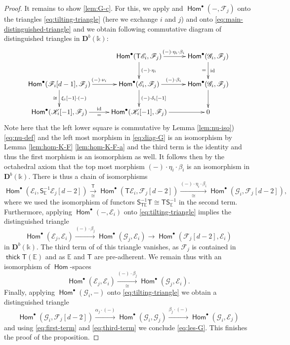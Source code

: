 \documentclass[a4paper,11pt, reqno]{amsart}
\def\E{\mathbb E}
\def\DD{\mathbf D}
\def\sE{\mathscr{E}}
\def\sF{\mathscr{F}}
\def\sG{\mathscr{G}}
\def\sK{\mathscr{K}}
\def\id{{\operatorname{id}}}
\newcommand{\opname}[1]{\operatorname{\mathsf{#1}}}
\newcommand{\Hom}{\opname{Hom}}
\newcommand{\thick}{\opname{thick}\nolimits}
\def\Db{\DD^b}
\newcommand{\bS}{\mathsf{S}}
\newcommand{\bT}{\mathsf{T}}
\theoremstyle{plain}
\theoremstyle{definition}
\numberwithin{equation}{section}
\newlength{\arrow}
\begin{document}
\begin{proof}
It remains to show \eqref{lem:G-c}. 
For this, 
we apply and $\Hom^\bullet ( - , \sF_j  )$ onto the triangles \eqref{eq:tilting-triangle} (here we exchange $i$ and $j$) and 
onto \eqref{eq:main-distinguished-triangle}
and we obtain following commutative diagram of distinguished triangles
in $\Db(\mathbb{k})$:
\begin{equation}\label{eq:diag-G}
\xymatrix{
     &  \Hom^\bullet ( \bT \sE_i  , \sF_j  ) \ar@{->}[d]^{(-)\cdot \eta_i } \ar@{->}[r]^{(-) \cdot \eta_i \cdot \beta_i } & \Hom^\bullet ( \sG_i , \sF_j  ) \ar@{->}[d]^{\id}_{=} \\
    \Hom^\bullet (  \sF_i [d-1]  , \sF_j ) \ar@{->}[d]^{\xi_i [-1] \cdot (-)}_{\cong} \ar@{->}[r]^{(-)\cdot \nu_i} &  \Hom^\bullet ( \sE_i  , \sF_j  ) \ar@{->}[d]^{(-)\cdot \delta_i [-1]} \ar@{->}[r]^{(-)\cdot \beta_i } & \Hom^\bullet ( \sG_i , \sF_j  ) \ar@{->}[d]^{} \\
 \Hom^\bullet ( \sK_i [-1] , \sF_j  ) \ar@{->}[r]^{\id}_{=} &  \Hom^\bullet (   \sK_i [-1] , \sF_j  ) \ar@{->}[r]^{} & 0 }
\end{equation}
Note here that the left lower square 
is commutative by  Lemma \ref{lem:nu-iso}) \eqref{eq:nu-def}
and the left most morphism in \eqref{eq:diag-G}
is an isomorphism by Lemma \ref{lem:hom-K-F} \eqref{lem:hom-K-F-a} and the third term is the identity and thus the first morphism is an isomorphism as well.
It follows then by the octahedral axiom that the top most morphism $(-)\cdot \eta_i \cdot \beta_i$ is an isomorphism in $\Db ( \mathbb{k})$.
There is thus a chain of isomorphisms
\begin{equation}\label{eq:first-term}
   \Hom^\bullet ( \sE_i , \bS^{-1}_{\E} \sE_j [d-2] ) \xrightarrow[\cong]{\bT} \Hom^\bullet ( \bT \sE_i , \sF_j [d-2] ) \xrightarrow[\cong]{(-)\cdot \eta_i \cdot \beta_i} \Hom^\bullet ( \sG_i , \sF_j [d-2] )  ,
\end{equation}
where we used the isomorphism of functors $\bS^{-1}_{\bT\E}  \bT \cong \bT  \bS^{-1}_{\E}$ in the second term.
Furthermore, applying $\Hom^\bullet ( - , \sE_i )$ onto \eqref{eq:tilting-triangle} implies the distinguished triangle 
\[
\Hom^\bullet (\sE_j , \sE_i ) \xrightarrow{(-)\cdot \beta_j} \Hom^\bullet ( \sG_j , \sE_i ) \to \Hom^\bullet ( \sF_j [d-2] , \sE_i ) 
\]
in $\Db(\mathbb{k})$.
The third term of of this triangle vanishes, as $\sF_j$ is contained in $\thick\bT( \E )$ and as $\E$ and $\bT$ are pre-adherent.
We remain thus with an isomorphism of $\Hom$-spaces
\begin{equation}\label{eq:third-term}
    \Hom^\bullet (\sE_j , \sE_i ) \xrightarrow[\cong]{(-)\cdot \beta_j} \Hom^\bullet ( \sG_j , \sE_i ) .
\end{equation}
Finally, applying $\Hom^\bullet ( \sG_i , - )$ onto \eqref{eq:tilting-triangle} we obtain a distinguished triangle 
\[
\Hom^\bullet ( \sG_i , \sF_j [d-2] ) \xrightarrow{\alpha_j \cdot (-)} \Hom^\bullet ( \sG_i , \sG_j ) \xrightarrow{\beta_j \cdot (-)} \Hom^\bullet ( \sG_i , \sE_j )
\]
and using \eqref{eq:first-term} and \eqref{eq:third-term} we conclude \eqref{eq:les-G}.
This finishes the proof of the proposition.
\end{proof}
\end{document}
